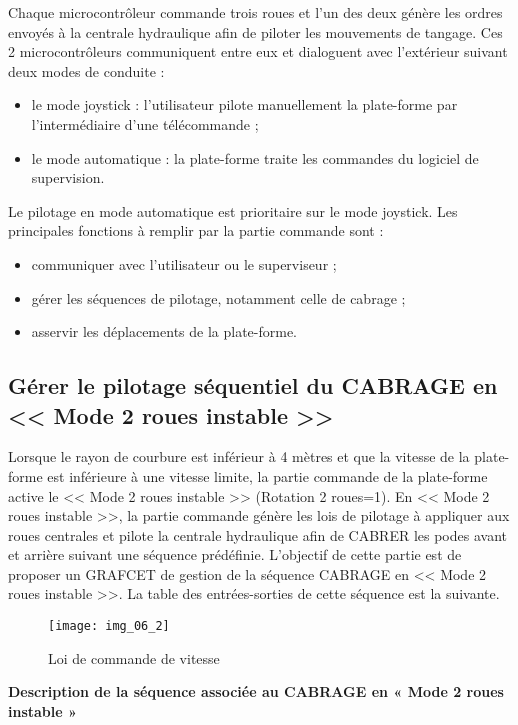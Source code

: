 Chaque microcontrôleur commande trois roues et l’un des deux génère les ordres envoyés à la centrale hydraulique afin de piloter les mouvements de tangage. Ces 2 microcontrôleurs communiquent entre eux et dialoguent avec l’extérieur suivant deux modes de conduite :
\begin{itemize}
\item le mode joystick : l’utilisateur pilote manuellement la plate-forme par l’intermédiaire d’une télécommande ;
\item le mode automatique : la plate-forme traite les commandes du logiciel de supervision.
\end{itemize}
Le pilotage en mode automatique est prioritaire sur le mode joystick. 
Les principales fonctions à remplir par la partie commande sont :
\begin{itemize}
\item communiquer avec l’utilisateur ou le superviseur ;
\item gérer les séquences de pilotage, notamment celle de cabrage ;
\item asservir les déplacements de la plate-forme.
\end{itemize}

\subsection{Gérer le pilotage séquentiel du CABRAGE en << Mode 2 roues instable >>}
Lorsque le rayon de courbure est inférieur à 4 mètres et que la vitesse de la plate-forme est inférieure à une vitesse
limite, la partie commande de la plate-forme active le << Mode 2 roues instable >> (Rotation 2 roues=1). En << Mode 2 roues instable >>, la partie commande génère les lois de pilotage à appliquer aux roues centrales et pilote la centrale hydraulique afin de CABRER les podes avant et arrière suivant une séquence prédéfinie.
L’objectif de cette partie est de proposer un GRAFCET de gestion de la
séquence CABRAGE en << Mode 2 roues instable >>. La table des
entrées-sorties de cette séquence est la suivante.

\begin{figure}[H]
\centering
\texttt{[image: img\_06\_2]}
\caption{Loi de commande de vitesse \label{img:06:2}}
\end{figure}

\textbf{Description de la séquence associée au CABRAGE en « Mode 2 roues instable »}

